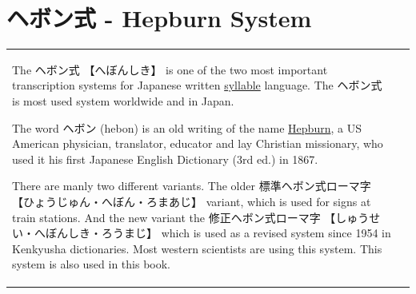 \section{ヘボン式 - Hepburn System} \label{sec:Hepburn}

\begin{tabular}{lr}
\begin{minipage}{11cm}

The { ヘボン式} {【へぼんしき】} is one of the two most important transcription
systems for Japanese written \hyperref[sec:Syllable]{syllable} language. The
{ヘボン式} is most used system worldwide and in Japan.

The word {ヘボン} (hebon) is an old writing of the name
\href{http://en.wikipedia.org/wiki/James_Curtis_Hepburn}{Hepburn}, a US
American  physician, translator, educator and lay Christian missionary, who
used it his first Japanese English Dictionary (3rd ed.) in 1867.

There are manly two different variants. The older {標準ヘボン式ローマ字}
{【ひょうじゅん・へぼん・ろまあじ】} variant, which is used for signs at train
stations. And the new variant the {修正ヘボン式ローマ字}
{【しゅうせい・へぼんしき・ろうまじ】} which is used as a revised system since 1954
in Kenkyusha dictionaries. Most western scientists are using this system. This
system is also used in this book.


\end{minipage}
\end{tabular}
